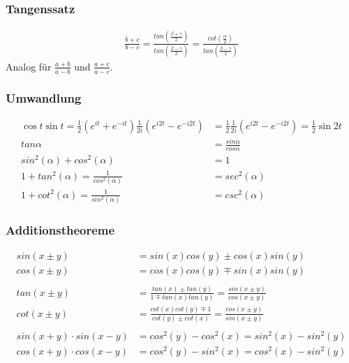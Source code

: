 \documentclass[12pt,a4paper]{article}%
\numberwithin{equation}{section}
\numberwithin{equation}{subsection}
\begin{document}
	  \subsubsection{Tangenssatz}
	  \begin{align}
	    \frac{b + c}{b - c} = \frac{tan\left(\frac{\beta + \gamma}{2}\right)}{tan\left(\frac{\beta - \gamma}{2}\right)} 
	    = \frac{cot\left(\frac{\alpha}{2} \right)}{tan\left(\frac{\beta - \gamma}{2}\right)}
	  \end{align}
	  Analog für $\frac{a + b}{a - b}$ und $\frac{a + c}{a - c}$.\label{eq:trigo_tangenssatz}
	  
	  \subsubsection{Umwandlung}
	  \begin{align}
	    \cos t \sin t = \frac{1}{2} \left(e^{it}+e^{-it}\right) \frac{1}{2i}\left(e^{i2t} - e^{-i2t}\right) &= \frac{1}{2} \frac{1}{2i}\left( e^{i2t}-e^{-i2t}\right) = \frac{1}{2}\sin 2t\\
	    tan\alpha &= \frac{sin\alpha}{cos\alpha}\\
	    sin^2(\alpha) + cos^2(\alpha) &= 1\\
	    1 + tan^2(\alpha) = \frac{1}{cos^2(\alpha)} &= sec^2(\alpha)\\
	    1 + cot^2(\alpha) = \frac{1}{sin^2(\alpha)} &= csc^2(\alpha)\label{eq:trigo_umwandlung}
	  \end{align}
	  
	  \subsubsection{Additionstheoreme}
	  \begin{align}
	    sin(x \pm y) &= sin(x) cos(y) \pm cos(x) sin(y)\\
	    cos(x \pm y) &= cos(x) cos(y) \mp sin(x) sin(y)\\\\
	    tan(x \pm y) &= \frac{tan(x) \pm tan(y)}{1 \mp tan(x) tan(y)} = \frac{sin(x \pm y)}{cos(x \pm y)}\\
	    cot(x \pm y) &= \frac{cot(x) cot(y) \mp 1}{cot(y) \pm cot(x)} = \frac{cos(x \pm y)}{sin(x \pm y)}\\\\
	    sin(x + y) \cdot sin(x - y) &= cos^2(y) - cos^2(x) = sin^2(x) - sin^2(y)\\
	    cos(x + y) \cdot cos(x - y) &= cos^2(y) - sin^2(x) = cos^2(x) - sin^2(y)\label{eq:trigo_addtheo}
	  \end{align}
	  
\end{document}
